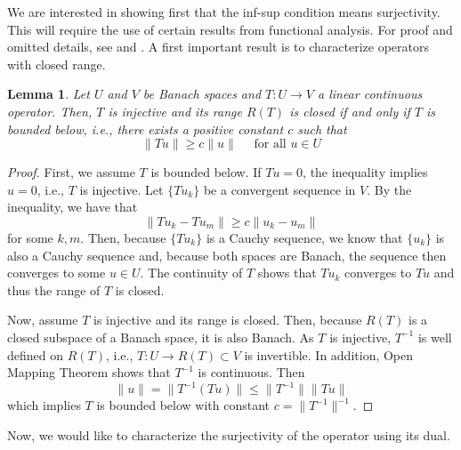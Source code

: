 \documentclass{article}
\newtheorem{lemma}{Lemma}
\begin{document}
We are interested in showing first that the inf-sup condition means 
surjectivity. This will require the use of certain results from 
functional analysis. For proof and omitted details, see \cite{chen2024infSup} 
and \cite{gatica2014simple}. A first important result is to characterize 
operators with closed range. 

\begin{lemma}
    Let \(U\) and \( V\) be Banach spaces and \(T:U\to V\) a linear 
    continuous operator. Then, \(T\) is injective and its range \(R(T)\) is 
    closed if and only if  \(T\) is bounded below, i.e., there exists 
    a positive constant \(c\) such that 
    \begin{displaymath}
        \lVert Tu \rVert \ge c\lVert u \rVert
        \quad \text{ for all } u\in U
    \end{displaymath}
\end{lemma}
\begin{proof}
    First, we assume \(T\) is bounded below. If \(Tu=0\), the inequality 
    implies \(u=0\), i.e., \(T\) is injective. Let \(\{Tu_k\}\) be a convergent 
    sequence in \(V\). By the inequality, we have that
    \begin{displaymath}
        \lVert Tu_k - Tu_m \rVert \ge c\lVert u_k - u_m \rVert
    \end{displaymath}
    for some \(k,m\). Then, because \(\{Tu_k\}\) is a Cauchy sequence, we 
    know that \(\{u_k\}\) is also a Cauchy sequence and, because both spaces 
    are Banach, the sequence then converges to some \(u\in U\). The continuity 
    of \(T\) shows that \(Tu_k\) converges to \(Tu\) and thus the range of 
    \(T\) is closed. 

    Now, assume \(T\) is injective and its range is closed. Then, because 
    \(R(T)\) is a closed subspace of a Banach space, it is also Banach. As 
    \( T\) is injective, \(T^{-1}\) is well defined on \(R(T)\), i.e., 
    \(T:U\to R(T)\subset V\) is invertible. In addition, Open Mapping Theorem 
    shows that \(T^{-1}\) is continuous. Then
    \begin{displaymath}
        \lVert u \rVert = \lVert T^{-1}(Tu) \rVert 
        \le \lVert T^{-1} \rVert \lVert Tu \rVert 
    \end{displaymath}
    which implies \(T\) is bounded below with constant 
    \(c = \lVert T^{-1} \rVert^{-1}\).
\end{proof}

Now, we would like to characterize the surjectivity of the operator using its dual.
\end{document}
